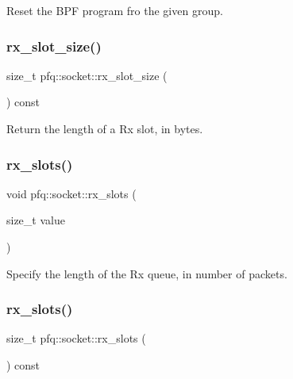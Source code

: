 Reset the B\+PF program fro the given group. 

\mbox{\label{classpfq_1_1socket_ac46fe8e1ba3313003dc3e4ee1411ef63}} 
\subsubsection{\texorpdfstring{rx\+\_\+slot\+\_\+size()}{rx\_slot\_size()}}
{\footnotesize\ttfamily size\+\_\+t pfq\+::socket\+::rx\+\_\+slot\+\_\+size (\begin{DoxyParamCaption}{ }\end{DoxyParamCaption}) const\hspace{0.3cm}{\ttfamily [inline]}}



Return the length of a Rx slot, in bytes. 

\mbox{\label{classpfq_1_1socket_a5cf700fc12d67b91df3d669ac4aa737a}} 
\subsubsection{\texorpdfstring{rx\+\_\+slots()}{rx\_slots()}\hspace{0.1cm}{\footnotesize\ttfamily [1/2]}}
{\footnotesize\ttfamily void pfq\+::socket\+::rx\+\_\+slots (\begin{DoxyParamCaption}\item[{size\+\_\+t}]{value }\end{DoxyParamCaption})\hspace{0.3cm}{\ttfamily [inline]}}



Specify the length of the Rx queue, in number of packets. 

\mbox{\label{classpfq_1_1socket_a34d80296c96c3e727f437d0be1b81dd8}} 
\subsubsection{\texorpdfstring{rx\+\_\+slots()}{rx\_slots()}\hspace{0.1cm}{\footnotesize\ttfamily [2/2]}}
{\footnotesize\ttfamily size\+\_\+t pfq\+::socket\+::rx\+\_\+slots (\begin{DoxyParamCaption}{ }\end{DoxyParamCaption}) const\hspace{0.3cm}{\ttfamily [inline]}}




